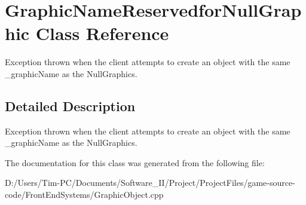\hypertarget{class_graphic_name_reservedfor_null_graphic}{}\section{Graphic\+Name\+Reservedfor\+Null\+Graphic Class Reference}
\label{class_graphic_name_reservedfor_null_graphic}


Exception thrown when the client attempts to create an object with the same \+\_\+graphic\+Name as the Null\+Graphics.  




\subsection{Detailed Description}
Exception thrown when the client attempts to create an object with the same \+\_\+graphic\+Name as the Null\+Graphics. 

The documentation for this class was generated from the following file\+:\begin{DoxyCompactItemize}
\item 
D\+:/\+Users/\+Tim-\/\+P\+C/\+Documents/\+Software\+\_\+\+I\+I/\+Project/\+Project\+Files/game-\/source-\/code/\+Front\+End\+Systems/Graphic\+Object.\+cpp\end{DoxyCompactItemize}
